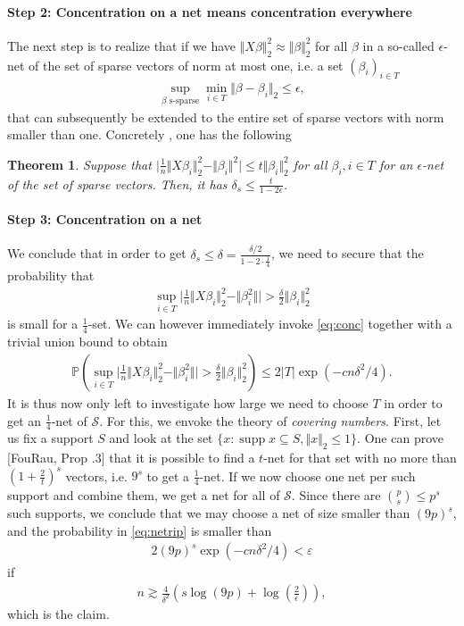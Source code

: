 \documentclass{article}
\DeclareMathOperator{\supp}{\mathrm{supp}}
\newcommand{\calS}{\mathcal{S}}
\newcommand{\sse}{\subseteq}
\newtheorem{theorem}{Theorem}
\newcommand{\abs}[1]{\vert #1 \vert}
\newcommand{\norm}[1]{\Vert #1 \Vert}
\begin{document}
\paragraph{Step 2: Concentration on a net means concentration everywhere}
The next step is to realize that if we have $\norm{X\beta}_2^2 \approx \norm{\beta}_2^2$ for all $\beta$ in a so-called $\epsilon$-net of the set of sparse vectors of norm at most one, i.e. a set $(\beta_i)_{i \in T}$
\begin{align*}
    \sup_{\beta \text{ s-sparse}} \min_{i \in T} \norm{\beta-\beta_i}_2 \leq \epsilon,
\end{align*}
that can subsequently be extended to the entire set of sparse vectors with norm smaller than one. Concretely , one has the following
\begin{theorem}
    Suppose that $\abs{\frac{1}{n} \norm{X\beta_i}_2^2 - \norm{\beta_i}^2} \leq t\norm{\beta_i}_2^2$ for all $\beta_i, i \in T$ for an $\epsilon$-net of the set of sparse vectors. Then, it has $\delta_s \leq \frac{t}{1-2\epsilon}$.
\end{theorem}

\paragraph{Step 3: Concentration on a net} We conclude that in order to get $\delta_s \leq \delta = \tfrac{\delta/2}{1-2\cdot\tfrac{1}{4}}$, we need to secure that the probability that 
\begin{align*}
    \sup_{i \in T} \abs{\frac{1}{n} \norm{X\beta_i}_2^2 - \norm{\beta_i^2}} >\tfrac{\delta}{2}\norm{\beta_i}^2_2
\end{align*}
is small for a $\tfrac{1}{4}$-set. We can however immediately invoke \eqref{eq:conc} together with a trivial union bound to obtain
\begin{align}
    \mathbb{P}\left( \sup_{i \in T} \abs{\frac{1}{n} \norm{X\beta_i}_2^2 - \norm{\beta_i^2}} >\frac{\delta}{2}\norm{\beta_i}^2_2 \right) \leq 2\abs{T}\exp(-cn\delta^2/4). \label{eq:netrip}
\end{align}
It is thus now only left to investigate how large we need to choose $T$ in order to get an $\tfrac{1}{4}$-net of $\calS$. For this, we envoke the theory of \emph{covering numbers}. First, let us fix a support $S$ and look at the set $\{x : \supp x \sse S, \norm{x}_2 \leq 1\}$. One can prove [FouRau, Prop .3] that it is possible to find a $t$-net for that set with no more than $(1+\frac{2}{t})^s$ vectors, i.e. $9^s$ to get a $\tfrac{1}{4}$-net. If we now choose one net per such support and combine them, we get a net for all of $\mathcal{S}$. Since there are $\binom{p}{s}\leq p^s$ such supports, we conclude that we may choose a net of size smaller than $(9p)^s$, and the probability in \eqref{eq:netrip} is smaller than
\begin{align*}
    2(9p)^s\exp(-cn\delta^2/4) <\varepsilon
\end{align*}
if 
\begin{align*}
    n \gtrsim \frac{4}{\delta^2}(s\log(9p) + \log(\tfrac{2}{\epsilon})),
\end{align*}
which is the claim.
\end{document}
